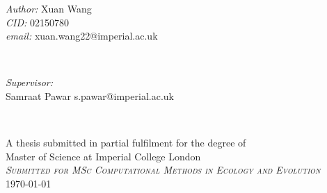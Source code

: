 \begin{titlepage}
    \begin{minipage}{0.5\textwidth}
    \begin{flushleft} \large
    \emph{Author:} Xuan Wang \\
    \emph{CID:} 02150780\\
    \emph{email:} xuan.wang22@imperial.ac.uk
    \end{flushleft}
    \end{minipage}
    ~
    \begin{minipage}{0.4\textwidth}
    \begin{flushright} \large
    \emph{Supervisor:} \\
    Samraat Pawar
    s.pawar@imperial.ac.uk\\[1.2em]
    \end{flushright}
    \end{minipage}\\[2.5cm]
    \makeatother
    
    \vspace{1cm}
 
    {\large A thesis submitted in partial fulfilment for the degree of}\\[0.1cm]
    \large Master of Science at Imperial College London\\[0.1cm]
    \textsc{\large \emph{Submitted for MSc Computational Methods in Ecology and Evolution}}\\[0.2cm] %
    {\large \monthyeardate\today}\\ %
    
    
    \vfill %
	
\end{titlepage}
